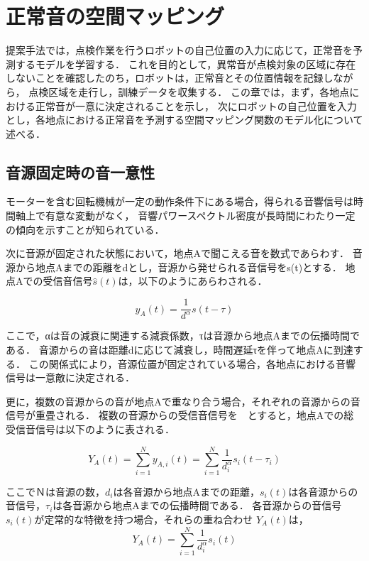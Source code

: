 \documentclass[../main]{subfiles}
\begin{document}
\section{正常音の空間マッピング}

提案手法では，点検作業を行うロボットの自己位置の入力に応じて，正常音を予測するモデルを学習する．
これを目的として，異常音が点検対象の区域に存在しないことを確認したのち，ロボットは，正常音とその位置情報を記録しながら，
点検区域を走行し，訓練データを収集する．
この章では，まず，各地点における正常音が一意に決定されることを示し，
次にロボットの自己位置を入力とし，各地点における正常音を予測する空間マッピング関数のモデル化について述べる．
\subsection{音源固定時の音一意性}

モーターを含む回転機械が一定の動作条件下にある場合，得られる音響信号は時間軸上で有意な変動がなく，
音響パワースペクトル密度が長時間にわたり一定の傾向を示すことが知られている\cite{beranek1992noise}．

次に音源が固定された状態において，地点Aで聞こえる音を数式であらわす．
音源から地点Aまでの距離をdとし，音源から発せられる音信号をs(t)とする．
地点Aでの受信音信号\(\hat{s}(t)\)は，以下のようにあらわされる．

\begin{equation} y_A(t) = \frac{1}{d^\alpha} s(t - \tau) \end{equation}

ここで，αは音の減衰に関連する減衰係数，τは音源から地点Aまでの伝播時間である．
音源からの音は距離dに応じて減衰し，時間遅延τを伴って地点Aに到達する．
この関係式により，音源位置が固定されている場合，各地点における音響信号は一意敵に決定される．

更に，複数の音源からの音が地点Aで重なり合う場合，それぞれの音源からの音信号が重畳される．
複数の音源からの受信音信号を　とすると，地点Aでの総受信音信号は以下のように表される．

\begin{equation} Y_A(t) = \sum_{i=1}^{N} y_{A,i}(t) = \sum_{i=1}^{N} \frac{1}{d_i^\alpha} s_i(t - \tau_i) \end{equation}

ここでＮは音源の数，\(d_i\)は各音源から地点Aまでの距離，\(s_i(t)\)は各音源からの音信号，\(\tau_i\)は各音源から地点Aまでの伝播時間である．
各音源からの音信号　\(s_i(t)\)が定常的な特徴を持つ場合，それらの重ね合わせ
\(Y_A(t)\)は，
\begin{equation} Y_A(t) = \sum_{i=1}^{N} \frac{1}{d_i^\alpha} s_i(t) \end{equation}
\end{document}
